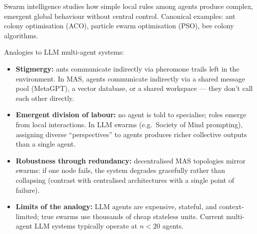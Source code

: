 Swarm intelligence studies how simple local rules among agents produce complex,
emergent global behaviour without central control. Canonical examples: ant colony
optimisation (ACO), particle swarm optimisation (PSO), bee colony algorithms.

Analogies to LLM multi-agent systems:
\begin{itemize}
  \item \textbf{Stigmergy:} ants communicate indirectly via pheromone trails left in
    the environment. In MAS, agents communicate indirectly via a shared message pool
    (MetaGPT), a vector database, or a shared workspace --- they don't call each other
    directly.
  \item \textbf{Emergent division of labour:} no agent is told to specialise; roles
    emerge from local interactions. In LLM swarms (e.g.\ Society of Mind prompting),
    assigning diverse ``perspectives'' to agents produces richer collective outputs
    than a single agent.
  \item \textbf{Robustness through redundancy:} decentralised MAS topologies mirror
    swarms: if one node fails, the system degrades gracefully rather than collapsing
    (contrast with centralised architectures with a single point of failure).
  \item \textbf{Limits of the analogy:} LLM agents are expensive, stateful, and
    context-limited; true swarms use thousands of cheap stateless units. Current
    multi-agent LLM systems typically operate at $n < 20$ agents.
\end{itemize}


